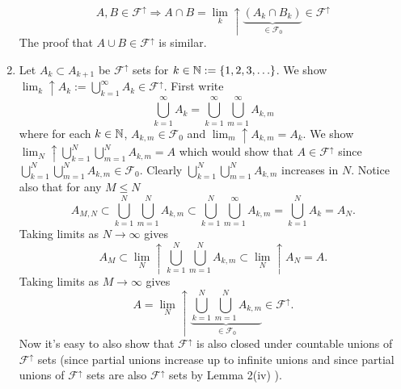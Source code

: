 \documentclass[10pt,letterpaper]{article}
\begin{document}
\begin{enumerate}
\[ A,B \in \mathcal F^\uparrow \Longrightarrow A\cap B= \lim_k\!\!\uparrow \underbrace{(A_k\cap B_k)}_{\in \mathcal F_0} \in \mathcal F^\uparrow\]
The proof that $A\cup B \in \mathcal F^\uparrow$ is similar.
\item Let $A_k\subset A_{k+1}$ be $\mathcal F^\uparrow$ sets for $k\in \Bbb N:=\{ 1,2,3,\ldots\}$. We show $\lim_k\!\!\uparrow A_k := \bigcup_{k=1}^\infty A_k\in \mathcal F^\uparrow $. First write 
\[ \bigcup_{k=1}^\infty A_k =  \bigcup_{k=1}^\infty  \bigcup_{m=1}^\infty A_{k,m}\]
 where for each $k\in \Bbb N$,  $A_{k,m}\in \mathcal F_0$ and $\lim_m\!\!\uparrow A_{k,m} = A_k$. We show $\lim_N\!\!\uparrow \bigcup^{N}_{k=1}\bigcup^N_{m=1}A_{k,m} = A$ which would show that $A\in \mathcal F^\uparrow$ since $\bigcup^{N}_{k=1}\bigcup^N_{m=1}A_{k,m} \in \mathcal F_0$. Clearly $\bigcup^{N}_{k=1}\bigcup^N_{m=1}A_{k,m}$ increases in $N$.
Notice also that for any $M\leq N$
\begin{equation}
\label{monotone}
 A_{M,N} \subset \bigcup^{N}_{k=1}\bigcup^N_{m=1}A_{k,m}\subset \bigcup^{N}_{k=1}\bigcup^\infty_{m=1}A_{k,m} =\bigcup^{N}_{k=1}A_{k}=A_N.\end{equation}
Taking limits as $N\rightarrow \infty$ gives
 \[ A_{M} \subset\lim_N\!\!\uparrow \bigcup^{N}_{k=1}\bigcup^N_{m=1}A_{k,m} \subset \lim_N\!\!\uparrow A_N=A.
  \]
Taking limits as $M\rightarrow\infty$ gives
\begin{equation}
\label{tt}
A = \lim_N\!\!\uparrow\underbrace{ \bigcup^{N}_{k=1}\bigcup^N_{m=1}A_{k,m}}_{\in \mathcal F_0} \in \mathcal F^\uparrow.\end{equation}
Now it's easy to also show that $\mathcal F^\uparrow$ is also closed under countable unions of $\mathcal F^\uparrow$ sets (since partial unions increase up to infinite unions and since partial unions of $\mathcal F^\uparrow$ sets are also  $\mathcal F^\uparrow$ sets by Lemma 2(iv) ).
 \end{enumerate} 


\end{document}
